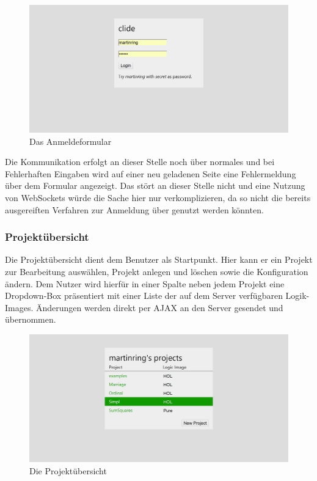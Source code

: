\begin{figure}[!ht]
\includegraphics[width=\linewidth]{images/screen-login}
  \caption{Das Anmeldeformular}
  \label{fig:screen-login}
\end{figure}

Die Kommunikation erfolgt an dieser Stelle noch über normales  und bei Fehlerhaften
Eingaben wird auf einer neu geladenen Seite eine Fehlermeldung über dem Formular angezeigt. Das
stört an dieser Stelle nicht und eine Nutzung von WebSockets würde die Sache hier nur
verkomplizieren, da so nicht die bereits ausgereiften Verfahren zur Anmeldung über 
genutzt werden könnten.

\subsubsection{Projektübersicht}

Die Projektübersicht dient dem Benutzer als Startpunkt. Hier kann er ein Projekt zur Bearbeitung
auswählen, Projekt anlegen und löschen sowie die Konfiguration ändern. Dem Nutzer wird hierfür in
einer Spalte neben jedem Projekt eine Dropdown-Box präsentiert mit einer Liste der auf dem Server
verfügbaren Logik-Images. Änderungen werden direkt per AJAX an den Server gesendet und übernommen.

\begin{figure}[!ht]
\includegraphics[width=\linewidth]{images/screen-projects}
  \caption{Die Projektübersicht}
  \label{fig:screen-projects}
\end{figure}

